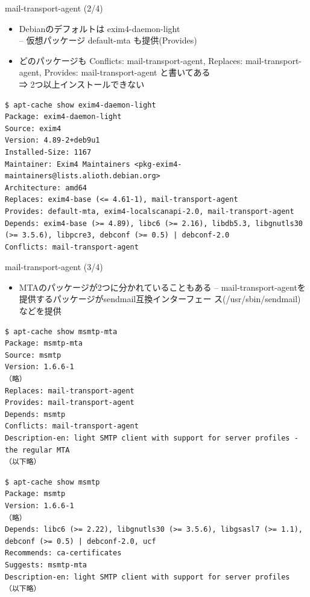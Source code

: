 \begin{frame}[containsverbatim]{mail-transport-agent (2/4)}
 \begin{itemize}
  \item Debianのデフォルトは exim4-daemon-light\\
	-- 仮想パッケージ default-mta も提供(Provides)
 \item どのパッケージも Conflicts: mail-transport-agent, Replaces:
       mail-transport-agent, Provides: mail-transport-agent と書いてある\\
       ⇒ 2つ以上インストールできない
 \end{itemize}

 \scriptsize
\begin{verbatim}
$ apt-cache show exim4-daemon-light
Package: exim4-daemon-light
Source: exim4
Version: 4.89-2+deb9u1
Installed-Size: 1167
Maintainer: Exim4 Maintainers <pkg-exim4-maintainers@lists.alioth.debian.org>
Architecture: amd64
Replaces: exim4-base (<= 4.61-1), mail-transport-agent
Provides: default-mta, exim4-localscanapi-2.0, mail-transport-agent
Depends: exim4-base (>= 4.89), libc6 (>= 2.16), libdb5.3, libgnutls30 (>= 3.5.6), libpcre3, debconf (>= 0.5) | debconf-2.0
Conflicts: mail-transport-agent
\end{verbatim}
 \normalsize
\end{frame}

\begin{frame}[containsverbatim]{mail-transport-agent (3/4)}
 \begin{itemize}
 \item MTAのパッケージが2つに分かれていることもある --
       mail-transport-agentを提供するパッケージがsendmail互換インターフェー
       ス(/usr/sbin/sendmail)などを提供
 \end{itemize}

 \scriptsize
\begin{verbatim}
$ apt-cache show msmtp-mta
Package: msmtp-mta
Source: msmtp
Version: 1.6.6-1
（略）
Replaces: mail-transport-agent
Provides: mail-transport-agent
Depends: msmtp
Conflicts: mail-transport-agent
Description-en: light SMTP client with support for server profiles - the regular MTA
（以下略）
\end{verbatim}
\begin{verbatim}
$ apt-cache show msmtp
Package: msmtp
Version: 1.6.6-1
（略）
Depends: libc6 (>= 2.22), libgnutls30 (>= 3.5.6), libgsasl7 (>= 1.1), debconf (>= 0.5) | debconf-2.0, ucf
Recommends: ca-certificates
Suggests: msmtp-mta
Description-en: light SMTP client with support for server profiles
（以下略）
\end{verbatim}
 \normalsize
\end{frame}

